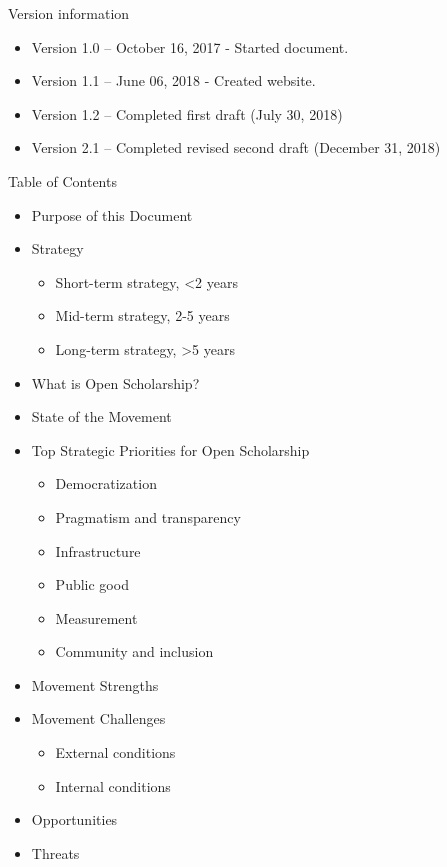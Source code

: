 \documentclass[]{article}
\date{}
\providecommand{\tightlist}{%
  \setlength{\itemsep}{0pt}\setlength{\parskip}{0pt}}
\begin{document}
Version information

\begin{itemize}
\tightlist
\item
  Version 1.0 -- October 16, 2017 - Started document.
\item
  Version 1.1 -- June 06, 2018 - Created website.
\item
  Version 1.2 -- Completed first draft (July 30, 2018)
\item
  Version 2.1 -- Completed revised second draft (December 31, 2018)
\end{itemize}

Table of Contents

\begin{itemize}
\tightlist
\item
  Purpose of this Document
\item
  Strategy

  \begin{itemize}
  \tightlist
  \item
    Short-term strategy, \textless{}2 years
  \item
    Mid-term strategy, 2-5 years
  \item
    Long-term strategy, \textgreater{}5 years
  \end{itemize}
\item
  What is Open Scholarship?
\item
  State of the Movement
\item
  Top Strategic Priorities for Open Scholarship

  \begin{itemize}
  \tightlist
  \item
    Democratization
  \item
    Pragmatism and transparency
  \item
    Infrastructure
  \item
    Public good
  \item
    Measurement
  \item
    Community and inclusion
  \end{itemize}
\item
  Movement Strengths
\item
  Movement Challenges

  \begin{itemize}
  \tightlist
  \item
    External conditions
  \item
    Internal conditions
  \end{itemize}
\item
  Opportunities
\item
  Threats
\end{itemize}
\end{document}
